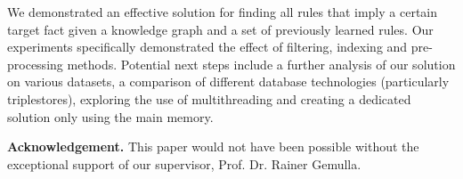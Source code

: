 \documentclass[english]{lni}
\begin{document}
We demonstrated an effective solution for finding all rules that imply a certain target fact given a knowledge graph and a set of previously learned rules. Our experiments specifically demonstrated the effect of filtering, indexing and pre-processing methods. Potential next steps include a further analysis of our solution on various datasets, a comparison of different database technologies (particularly triplestores), exploring the use of multithreading and creating a dedicated solution only using the main memory.

\textbf{Acknowledgement.} This paper would not have been possible without the exceptional support of our supervisor, Prof. Dr. Rainer Gemulla.

\end{document}
